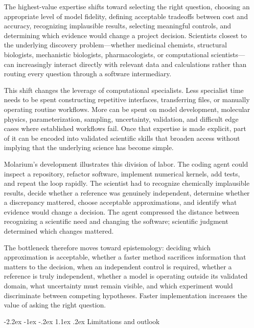 \documentclass[11pt]{article}
\makeatletter
\renewcommand\section{\@startsection{section}{1}{\z@}%
  {-2.2ex \@plus -1ex \@minus -.2ex}%
  {1.1ex \@plus .2ex}%
  {\normalfont\Large\bfseries\color{molblue}}}
\makeatother
\begin{document}
The highest-value expertise shifts toward selecting the right question, choosing an appropriate level of model fidelity, defining acceptable tradeoffs between cost and accuracy, recognizing implausible results, selecting meaningful controls, and determining which evidence would change a project decision. Scientists closest to the underlying discovery problem---whether medicinal chemists, structural biologists, mechanistic biologists, pharmacologists, or computational scientists---can increasingly interact directly with relevant data and calculations rather than routing every question through a software intermediary.

This shift changes the leverage of computational specialists. Less specialist time needs to be spent constructing repetitive interfaces, transferring files, or manually operating routine workflows. More can be spent on model development, molecular physics, parameterization, sampling, uncertainty, validation, and difficult edge cases where established workflows fail. Once that expertise is made explicit, part of it can be encoded into validated scientific skills that broaden access without implying that the underlying science has become simple.

Molarium's development illustrates this division of labor. The coding agent could inspect a repository, refactor software, implement numerical kernels, add tests, and repeat the loop rapidly. The scientist had to recognize chemically implausible results, decide whether a reference was genuinely independent, determine whether a discrepancy mattered, choose acceptable approximations, and identify what evidence would change a decision. The agent compressed the distance between recognizing a scientific need and changing the software; scientific judgment determined which changes mattered.

The bottleneck therefore moves toward epistemology: deciding which approximation is acceptable, whether a faster method sacrifices information that matters to the decision, when an independent control is required, whether a reference is truly independent, whether a model is operating outside its validated domain, what uncertainty must remain visible, and which experiment would discriminate between competing hypotheses. Faster implementation increases the value of asking the right question.

\section{Limitations and outlook}
\end{document}
